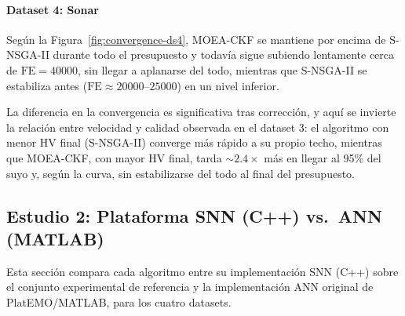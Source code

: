 \paragraph{Dataset 4: Sonar}\label{sec:ds4-convergencia}

Según la Figura~\ref{fig:convergence-ds4}, MOEA-CKF se mantiene por encima de S-NSGA-II durante todo el presupuesto y todavía sigue subiendo lentamente cerca de $\text{FE}=40000$, sin llegar a aplanarse del todo, mientras que S-NSGA-II se estabiliza antes ($\text{FE}\approx20000$--$25000$) en un nivel inferior.

La diferencia en la convergencia es significativa tras corrección, y aquí se invierte la relación entre velocidad y calidad observada en el dataset 3: el algoritmo con menor HV final (S-NSGA-II) converge más rápido a su propio techo, mientras que MOEA-CKF, con mayor HV final, tarda $\sim2.4\times$ más en llegar al 95\% del suyo y, según la curva, sin estabilizarse del todo al final del presupuesto. 



\subsection{Estudio 2: Plataforma SNN (C++) vs.\ ANN (MATLAB)}
\label{sec:estudio2}

Esta sección compara cada algoritmo entre su implementación SNN (C++) sobre el conjunto experimental de referencia y la implementación ANN original de PlatEMO/MATLAB, para los cuatro datasets.

